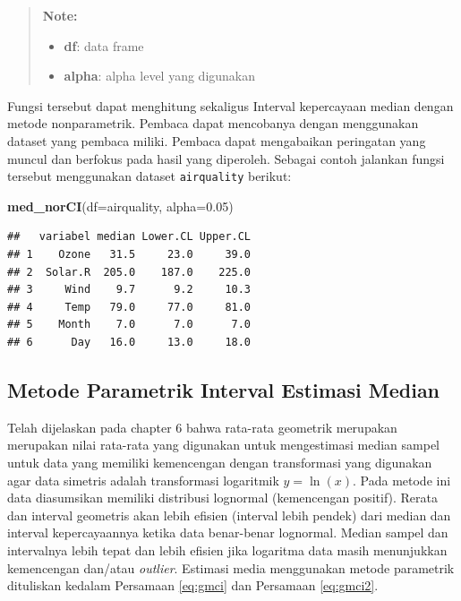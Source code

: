 \documentclass[]{book}
\newenvironment{Shaded}{\begin{snugshade}}{\end{snugshade}}
\newcommand{\KeywordTok}[1]{\textcolor[rgb]{0.13,0.29,0.53}{\textbf{#1}}}
\newcommand{\DataTypeTok}[1]{\textcolor[rgb]{0.13,0.29,0.53}{#1}}
\newcommand{\FloatTok}[1]{\textcolor[rgb]{0.00,0.00,0.81}{#1}}
\newcommand{\NormalTok}[1]{#1}
\providecommand{\tightlist}{%
  \setlength{\itemsep}{0pt}\setlength{\parskip}{0pt}}
\begin{document}
\begin{quote}
\textbf{Note: }

\begin{itemize}
\tightlist
\item
  \textbf{df}: data frame
\item
  \textbf{alpha}: alpha level yang digunakan
\end{itemize}
\end{quote}

Fungsi tersebut dapat menghitung sekaligus Interval kepercayaan median
dengan metode nonparametrik. Pembaca dapat mencobanya dengan menggunakan
dataset yang pembaca miliki. Pembaca dapat mengabaikan peringatan yang
muncul dan berfokus pada hasil yang diperoleh. Sebagai contoh jalankan
fungsi tersebut menggunakan dataset \texttt{airquality} berikut:

\begin{Shaded}
\begin{Highlighting}[]
\KeywordTok{med_norCI}\NormalTok{(}\DataTypeTok{df=}\NormalTok{airquality, }\DataTypeTok{alpha=}\FloatTok{0.05}\NormalTok{)}
\end{Highlighting}
\end{Shaded}

\begin{verbatim}
##   variabel median Lower.CL Upper.CL
## 1    Ozone   31.5     23.0     39.0
## 2  Solar.R  205.0    187.0    225.0
## 3     Wind    9.7      9.2     10.3
## 4     Temp   79.0     77.0     81.0
## 5    Month    7.0      7.0      7.0
## 6      Day   16.0     13.0     18.0
\end{verbatim}

\subsection{Metode Parametrik Interval Estimasi
Median}\label{metode-parametrik-interval-estimasi-median}

Telah dijelaskan pada chapter 6 bahwa rata-rata geometrik merupakan
merupakan nilai rata-rata yang digunakan untuk mengestimasi median
sampel untuk data yang memiliki kemencengan dengan transformasi yang
digunakan agar data simetris adalah transformasi logaritmik
\(y=\ln(x)\). Pada metode ini data diasumsikan memiliki distribusi
lognormal (kemencengan positif). Rerata dan interval geometris akan
lebih efisien (interval lebih pendek) dari median dan interval
kepercayaannya ketika data benar-benar lognormal. Median sampel dan
intervalnya lebih tepat dan lebih efisien jika logaritma data masih
menunjukkan kemencengan dan/atau \emph{outlier}. Estimasi media
menggunakan metode parametrik dituliskan kedalam Persamaan \eqref{eq:gmci}
dan Persamaan \eqref{eq:gmci2}.
\end{document}
